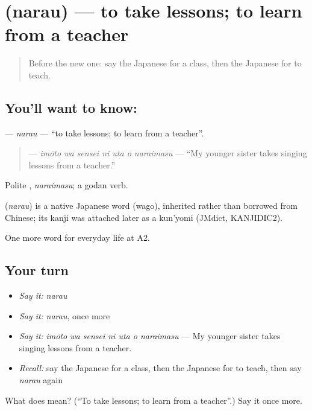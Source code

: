 \section[\texorpdfstring{\ja{ならう} (narau)}{ならう (narau)}]{ (narau) — to take lessons; to learn from a teacher}

\label{lesson:JA-C224-narau}



\begin{quote}
Before the new one: say the Japanese for a class, then the Japanese for to teach.
\end{quote}

\subsection*{You'll want to know: }
\textbf{} — \emph{narau} — \textquotedblleft{}to take lessons; to learn from a teacher\textquotedblright{}.

\begin{quote}
\textbf{   } — \emph{imōto wa sensei ni uta o naraimasu} — \textquotedblleft{}My younger sister takes singing lessons from a teacher.\textquotedblright{}
\end{quote}

Polite \textbf{}, \emph{naraimasu}; a godan verb.

\begin{cousinweb}
\textbf{} (\emph{narau}) is a native Japanese word (wago), inherited rather than borrowed from Chinese; its kanji was attached later as a kun'yomi (JMdict, KANJIDIC2).
\end{cousinweb}

\begin{grammarlens}[title={What you've built}]
One more word for everyday life at A2.
\end{grammarlens}

\subsection*{Your turn}
\begin{itemize}
\raggedright
  \item \emph{Say it:} \emph{narau}
  \item \emph{Say it:} \emph{narau}, once more
  \item \emph{Say it:} \emph{imōto wa sensei ni uta o naraimasu} — My younger sister takes singing lessons from a teacher.
  \item \emph{Recall:} say the Japanese for a class, then the Japanese for to teach, then say \emph{narau} again
\end{itemize}

\begin{tcolorbox}[breakable,colback=teal!4,colframe=teal!35!black,title={Before you move on}]
What does  mean? (\textquotedblleft{}To take lessons; to learn from a teacher\textquotedblright{}.) Say it once more.
\end{tcolorbox}
